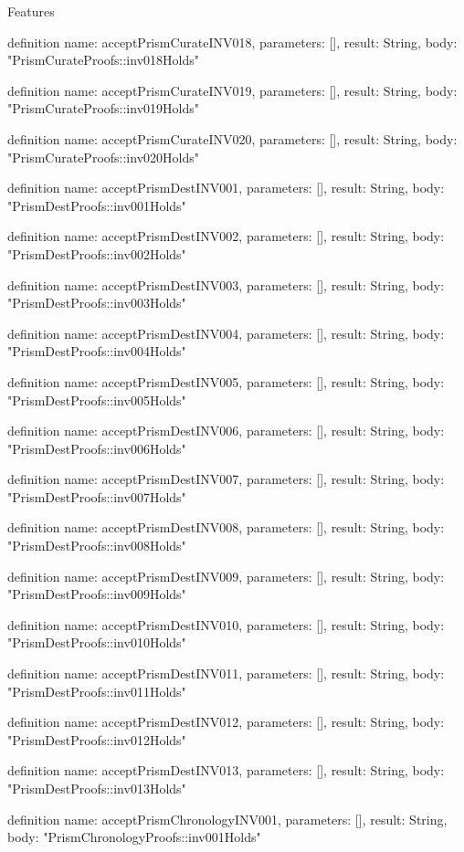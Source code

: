 \begin{lexlean}{Features}
\begin{semanticmodule}
definition{
  name: acceptPrismCurateINV018,
  parameters: [],
  result: String,
  body: "PrismCurateProofs::inv018Holds"
}

definition{
  name: acceptPrismCurateINV019,
  parameters: [],
  result: String,
  body: "PrismCurateProofs::inv019Holds"
}

definition{
  name: acceptPrismCurateINV020,
  parameters: [],
  result: String,
  body: "PrismCurateProofs::inv020Holds"
}

definition{
  name: acceptPrismDestINV001,
  parameters: [],
  result: String,
  body: "PrismDestProofs::inv001Holds"
}

definition{
  name: acceptPrismDestINV002,
  parameters: [],
  result: String,
  body: "PrismDestProofs::inv002Holds"
}

definition{
  name: acceptPrismDestINV003,
  parameters: [],
  result: String,
  body: "PrismDestProofs::inv003Holds"
}

definition{
  name: acceptPrismDestINV004,
  parameters: [],
  result: String,
  body: "PrismDestProofs::inv004Holds"
}

definition{
  name: acceptPrismDestINV005,
  parameters: [],
  result: String,
  body: "PrismDestProofs::inv005Holds"
}

definition{
  name: acceptPrismDestINV006,
  parameters: [],
  result: String,
  body: "PrismDestProofs::inv006Holds"
}

definition{
  name: acceptPrismDestINV007,
  parameters: [],
  result: String,
  body: "PrismDestProofs::inv007Holds"
}

definition{
  name: acceptPrismDestINV008,
  parameters: [],
  result: String,
  body: "PrismDestProofs::inv008Holds"
}

definition{
  name: acceptPrismDestINV009,
  parameters: [],
  result: String,
  body: "PrismDestProofs::inv009Holds"
}

definition{
  name: acceptPrismDestINV010,
  parameters: [],
  result: String,
  body: "PrismDestProofs::inv010Holds"
}

definition{
  name: acceptPrismDestINV011,
  parameters: [],
  result: String,
  body: "PrismDestProofs::inv011Holds"
}

definition{
  name: acceptPrismDestINV012,
  parameters: [],
  result: String,
  body: "PrismDestProofs::inv012Holds"
}

definition{
  name: acceptPrismDestINV013,
  parameters: [],
  result: String,
  body: "PrismDestProofs::inv013Holds"
}

definition{
  name: acceptPrismChronologyINV001,
  parameters: [],
  result: String,
  body: "PrismChronologyProofs::inv001Holds"
}


\end{semanticmodule}
\end{lexlean}
